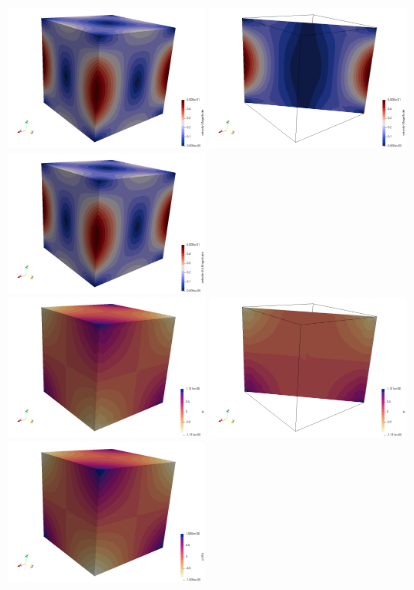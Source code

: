 \begin{center}
\includegraphics[width=5.2cm]{python_codes/fieldstone_82/results/bench5/vel1}
\includegraphics[width=5.2cm]{python_codes/fieldstone_82/results/bench5/vel2}
\includegraphics[width=5.2cm]{python_codes/fieldstone_82/results/bench5/velth}\\
\includegraphics[width=5.2cm]{python_codes/fieldstone_82/results/bench5/press1}
\includegraphics[width=5.2cm]{python_codes/fieldstone_82/results/bench5/press2}
\includegraphics[width=5.2cm]{python_codes/fieldstone_82/results/bench5/pressth}\\
\end{center}

